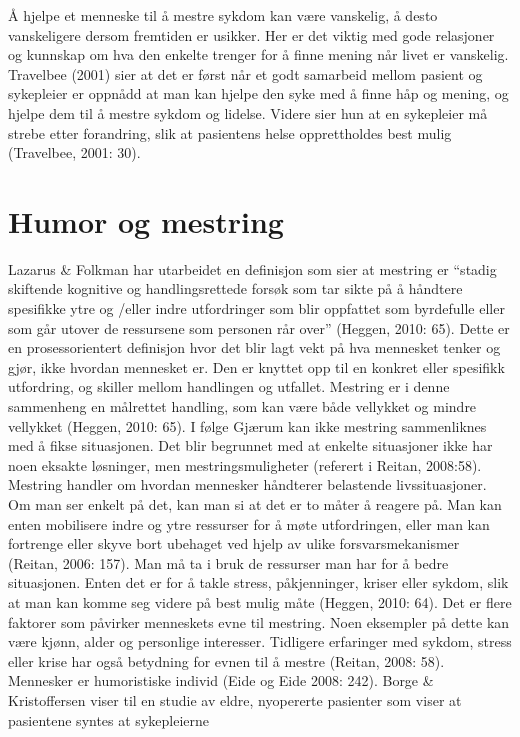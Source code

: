Å hjelpe et menneske til å mestre sykdom kan være vanskelig, å desto
vanskeligere dersom fremtiden er usikker. Her er det viktig med gode relasjoner
og kunnskap om hva den enkelte trenger for å finne mening når livet er
vanskelig. Travelbee (2001) sier at det er først når et godt samarbeid mellom
pasient og sykepleier er oppnådd at man kan hjelpe den syke med å finne håp og
mening, og hjelpe dem til å mestre sykdom og lidelse. Videre sier hun at en
sykepleier må strebe etter forandring, slik at pasientens helse opprettholdes
best mulig (Travelbee, 2001: 30).

\section{Humor og mestring}

Lazarus \&{} Folkman har utarbeidet en definisjon som sier at mestring er “stadig
skiftende kognitive og handlingsrettede forsøk som tar sikte på å håndtere
spesifikke ytre og /eller indre utfordringer som blir oppfattet som byrdefulle
eller som går utover de ressursene som personen rår over” (Heggen, 2010: 65).
Dette er en prosessorientert definisjon hvor det blir lagt vekt på hva
mennesket tenker og gjør, ikke hvordan mennesket er. Den er knyttet opp til en
konkret eller spesifikk utfordring, og skiller mellom handlingen og utfallet.
Mestring er i denne sammenheng en målrettet handling, som kan være både
vellykket og mindre vellykket (Heggen, 2010: 65). I følge Gjærum kan ikke
mestring sammenliknes med å fikse situasjonen. Det blir begrunnet med at
enkelte situasjoner ikke har noen eksakte løsninger, men mestringsmuligheter
(referert i Reitan, 2008:58).  Mestring handler om hvordan mennesker håndterer
belastende livssituasjoner. Om man ser enkelt på det, kan man si at det er to
måter å reagere på. Man kan enten mobilisere indre og ytre ressurser for å møte
utfordringen, eller man kan fortrenge eller skyve bort ubehaget ved hjelp av
ulike forsvarsmekanismer (Reitan, 2006: 157). Man må ta i bruk de ressurser man
har for å bedre situasjonen. Enten det er for å takle stress, påkjenninger,
kriser eller sykdom, slik at man kan komme seg videre på best mulig måte
(Heggen, 2010: 64).  Det er flere faktorer som påvirker menneskets evne til
mestring. Noen eksempler på dette kan være kjønn, alder og personlige
interesser. Tidligere erfaringer med sykdom, stress eller krise har også
betydning for evnen til å mestre (Reitan, 2008: 58).  Mennesker er humoristiske
individ (Eide og Eide 2008: 242). Borge \&{} Kristoffersen viser til en studie av
eldre, nyopererte pasienter som viser at pasientene syntes at sykepleierne

